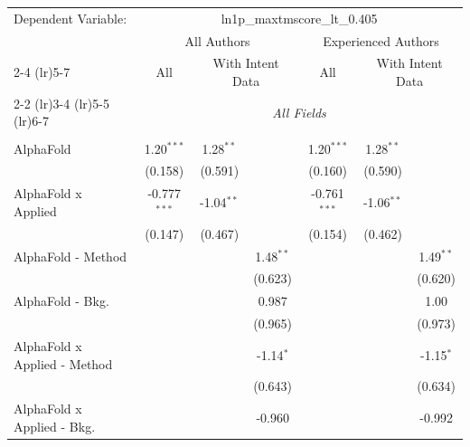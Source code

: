 \begingroup
\centering
\begin{tabular}{lcccccc}
   \tabularnewline \midrule \midrule
   Dependent Variable: & \multicolumn{6}{c}{ln1p\_maxtmscore\_lt\_0.405}\\
 & \multicolumn{3}{c}{All Authors} & \multicolumn{3}{c}{Experienced Authors} \\
\cmidrule(lr){2-4} \cmidrule(lr){5-7}
 & \multicolumn{1}{c}{All} & \multicolumn{2}{c}{With Intent Data} & \multicolumn{1}{c}{All} & \multicolumn{2}{c}{With Intent Data} \\
\cmidrule(lr){2-2} \cmidrule(lr){3-4} \cmidrule(lr){5-5} \cmidrule(lr){6-7}
 & \multicolumn{6}{c}{\textit{All Fields}} \\ \\
   AlphaFold                      & 1.20$^{***}$   & 1.28$^{**}$   &               & 1.20$^{***}$   & 1.28$^{**}$   &   \\   
                                  & (0.158)        & (0.591)       &               & (0.160)        & (0.590)       &   \\   
   AlphaFold x Applied            & -0.777$^{***}$ & -1.04$^{**}$  &               & -0.761$^{***}$ & -1.06$^{**}$  &   \\   
                                  & (0.147)        & (0.467)       &               & (0.154)        & (0.462)       &   \\   
   AlphaFold - Method             &                &               & 1.48$^{**}$   &                &               & 1.49$^{**}$\\   
                                  &                &               & (0.623)       &                &               & (0.620)\\   
   AlphaFold - Bkg.               &                &               & 0.987         &                &               & 1.00\\   
                                  &                &               & (0.965)       &                &               & (0.973)\\   
   AlphaFold x Applied - Method   &                &               & -1.14$^{*}$   &                &               & -1.15$^{*}$\\   
                                  &                &               & (0.643)       &                &               & (0.634)\\   
   AlphaFold x Applied - Bkg.     &                &               & -0.960        &                &               & -0.992\\   

\end{tabular}
